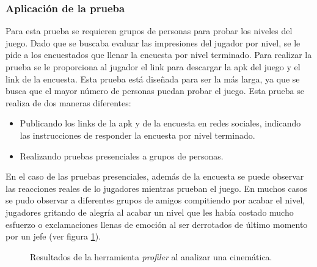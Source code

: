 \subsubsection{Aplicación de la prueba}
Para esta prueba se requieren grupos de personas para probar los niveles del
juego. Dado que se buscaba evaluar las impresiones del jugador por nivel, se le
pide a los encuestados que llenar la encuesta por nivel terminado. Para realizar
la prueba se le proporciona al jugador el link para descargar la apk del juego
y el link de la encuesta. Esta prueba está diseñada para ser la más larga, ya que
se busca que el mayor número de personas puedan probar el juego. Esta prueba se
realiza de dos maneras diferentes:
\begin{itemize}
        \item Publicando los links de la apk y de la encuesta en redes sociales,
        indicando las instrucciones de responder la encuesta por nivel terminado.
        \item Realizando pruebas presenciales a grupos de personas.
\end{itemize}
En el caso de las pruebas presenciales, además de la encuesta se puede observar
las reacciones reales de lo jugadores mientras prueban el juego. En muchos
casos se pudo observar a diferentes grupos de amigos compitiendo por acabar el
nivel, jugadores gritando de alegría al acabar un nivel que les había costado
mucho esfuerzo o exclamaciones llenas de emoción al ser derrotados de último
momento por un jefe (ver figura \ref{fig:AlumnosESCOM}).
\begin{figure}
  \centering
 
        
  \caption{Resultados de la herramienta \textit{profiler} al analizar una cinemática.}
  \label{fig:AlumnosESCOM}
\end{figure}
